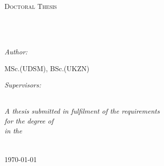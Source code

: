 \documentclass[11pt, oneside]{Thesis} %
\begin{document}
\begin{titlepage}
\begin{center}

\textsc{\LARGE \univname}\\[1.5cm] %
\textsc{\Large Doctoral Thesis}\\[0.5cm] %

\HRule \\[0.5cm] %
{\huge \bfseries \ttitle}\\[0.4cm] %
\HRule \\[1.5cm] %

\begin{minipage}{0.4\textwidth}
\begin{flushleft} \large
\emph{Author:}\\
{\authornames} %

MSc.(UDSM), BSc.(UKZN)
\end{flushleft}
\end{minipage}
\begin{minipage}{0.4\textwidth}
\begin{flushright} \large


\emph{Supervisors:} \\
{\supname} %
\end{flushright}
\end{minipage}\\[3cm]
 
\large \textit{A thesis submitted in fulfilment of the requirements\\ for the degree of \degreename}\\[0.3cm] %
\textit{in the}\\[0.4cm]
\groupname\\\deptname\\[2cm] %
 
{\large \today}\\[4cm] %
 
\vfill
\end{center}

\end{titlepage}
\clearpage
\end{document}
